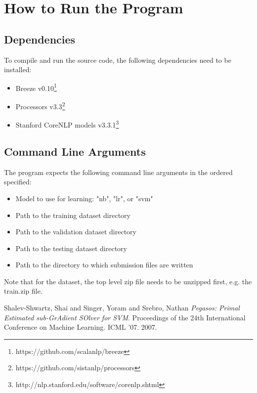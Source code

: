 \documentclass[11pt]{article}
\begin{document}
\section{How to Run the Program}

\subsection{Dependencies}
To compile and run the source code, the following dependencies need to be installed:
\begin{itemize}
    \item{Breeze v0.10\footnote{https://github.com/scalanlp/breeze}}
    \item{Processors v3.3\footnote{https://github.com/sistanlp/processors}}
    \item{Stanford CoreNLP models v3.3.1\footnote{http://nlp.stanford.edu/software/corenlp.shtml}}
\end{itemize}

\subsection{Command Line Arguments}
The program expects the following command line arguments in the ordered specified:
\begin{itemize}
    \item{Model to use for learning: "nb", "lr", or "svm"}
    \item{Path to the training dataset directory}
    \item{Path to the validation dataset directory}
    \item{Path to the testing dataset directory}
    \item{Path to the directory to which submission files are written}
\end{itemize}
Note that for the dataset, the top level zip file needs to be unzipped first, e.g. the train.zip file.

\begin{thebibliography}{9}

    Shalev-Shwartz, Shai and Singer, Yoram and Srebro, Nathan
    \emph{Pegasos: Primal Estimated sub-GrAdient SOlver for SVM}.
    Proceedings of the 24th International Conference on Machine Learning.
    ICML '07.
    2007.
\end{thebibliography}
\end{document}
